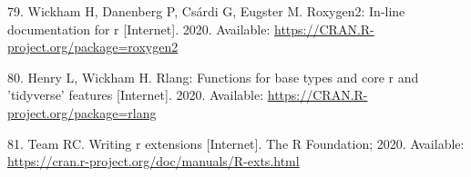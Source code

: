 \documentclass[10pt,letterpaper]{article}
\begin{document}
\leavevmode\hypertarget{ref-roxygen2}{}%
79. Wickham H, Danenberg P, Csárdi G, Eugster M. Roxygen2: In-line
documentation for r {[}Internet{]}. 2020. Available:
\url{https://CRAN.R-project.org/package=roxygen2}

\leavevmode\hypertarget{ref-rlang}{}%
80. Henry L, Wickham H. Rlang: Functions for base types and core r and
'tidyverse' features {[}Internet{]}. 2020. Available:
\url{https://CRAN.R-project.org/package=rlang}

\leavevmode\hypertarget{ref-Rcore2020}{}%
81. Team RC. Writing r extensions {[}Internet{]}. The R Foundation;
2020. Available:
\url{https://cran.r-project.org/doc/manuals/R-exts.html}

\nolinenumbers
\end{document}

